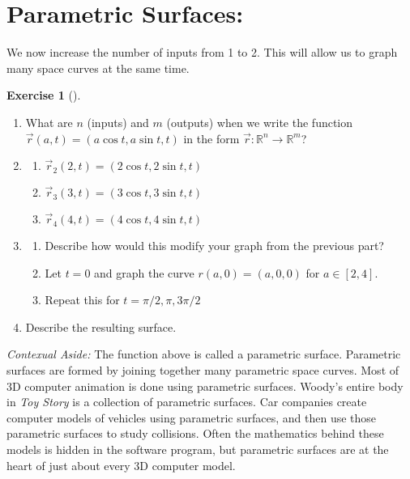 \documentclass[10pt,]{book}
\theoremstyle{plain}
\theoremstyle{definition}
\theoremstyle{definition}
\theoremstyle{definition}
\theoremstyle{definition}
\newtheorem{exploration}[project]{Exercise}
\theoremstyle{definition}
\numberwithin{equation}{section}
\begin{document}
\section[{Parametric Surfaces:}]{Parametric Surfaces:}\label{section-17}
We now increase the number of inputs from 1 to 2. This will allow us to graph many space curves at the same time.%
\begin{exploration}[]\label{prob_parametric_surface_example}
\leavevmode%
\begin{enumerate}[font=\bfseries,label=(\alph*),ref=\alph*]
\item\label{task-183} What are \(n\) (inputs) and \(m\) (outputs) when we write the function \(\vec r(a,t)=(a\cos t, a\sin t, t)\) in the form  \(\vec r\colon {\mathbb{R}}^n\to {\mathbb{R}}^m\)?%
\item\label{task-184} \begin{enumerate}[font=\bfseries,label=(\roman*),ref=\theenumi.\roman*]
\item\label{task-185} \(\vec r_2(2,t)=(2\cos t, 2\sin t, t)\)%
\item\label{task-186} \(\vec r_3(3,t)=(3\cos t, 3\sin t, t)\)%
\item\label{task-187} \(\vec r_4(4,t)=(4\cos t, 4\sin t, t)\)%
\end{enumerate}
\item\label{task-188} \begin{enumerate}[font=\bfseries,label=(\roman*),ref=\theenumi.\roman*]
\item\label{task-189} Describe how would this modify your graph from the previous part?%
\item\label{task-190} Let \(t=0\) and graph the curve \(r(a,0)=(a,0,0)\) for \(a\in[2,4]\).%
\item\label{task-191} Repeat this for \(t=\pi/2,\pi,3\pi/2\)%
\end{enumerate}
\item\label{task-192} Describe the resulting surface.%
\end{enumerate}
\end{exploration}
\emph{Contexual Aside:} The function above is called a parametric surface. Parametric surfaces are formed by joining together many parametric space curves. Most of 3D computer animation is done using parametric surfaces. Woody's entire body in \emph{Toy Story} is a collection of parametric surfaces. Car companies create computer models of vehicles using parametric surfaces, and then use those parametric surfaces to study collisions. Often the mathematics behind these models is hidden in the software program, but parametric surfaces are at the heart of just about every 3D computer model.%
\end{document}
